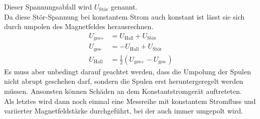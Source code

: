 Dieser Spannungsabfall wird $U_\text{Stör}$ genannt. \\
Da diese Stör-Spannung bei konstantem Strom auch konstant ist lässt sie sich durch umpolen des Magnetfeldes herausrechnen.
\begin{align*}
  U_\text{ges+}&=U_\text{Hall}+U_\text{Stör}\\
  U_\text{ges-}&=-U_\text{Hall}+U_\text{Stör}\\
  U_\text{Hall}&=\frac{1}{2}(U_\text{ges+}-U_\text{ges-})
\end{align*}
Es muss aber unbedingt darauf geachtet werden, dass die Umpolung der Spulen nicht abrupt geschehen darf, sondern die Spulen erst heruntergeregelt werden müssen.
Ansonsten können Schäden an dem Konstantstromgerät auftreteten.\\
Als letztes wird dann noch einmal eine Messreihe mit konstantem Stromfluss und variierter Magnetfeldstärke durchgeführt, bei der auch immer umgepolt wird.
